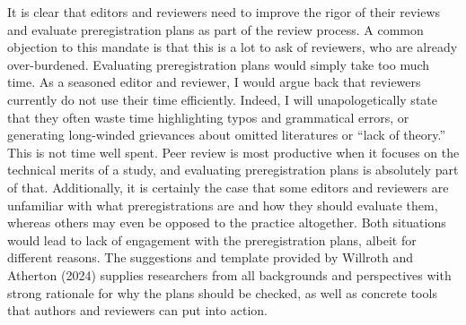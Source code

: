 \documentclass[authordate, meta, issue]{jote-new-article}
\begin{document}
	It is clear that editors and reviewers need to improve the rigor of their reviews and evaluate preregistration plans as part of the review process. A common objection to this mandate is that this is a lot to ask of reviewers, who are already over-burdened. Evaluating preregistration plans would simply take too much time. As a seasoned editor and reviewer, I would argue back that reviewers currently do not use their time efficiently. Indeed, I will unapologetically state that they often waste time highlighting typos and grammatical errors, or generating long-winded grievances about omitted literatures or “lack of theory.” This is not time well spent. Peer review is most productive when it focuses on the technical merits of a study, and evaluating preregistration plans is absolutely part of that. Additionally, it is certainly the case that some editors and reviewers are unfamiliar with what preregistrations are and how they should evaluate them, whereas others may even be opposed to the practice altogether. Both situations would lead to lack of engagement with the preregistration plans, albeit for different reasons. The suggestions and template provided by Willroth and Atherton (2024) supplies researchers from all backgrounds and perspectives with strong rationale for why the plans should be checked, as well as concrete tools that authors and reviewers can put into action.
\end{document}
